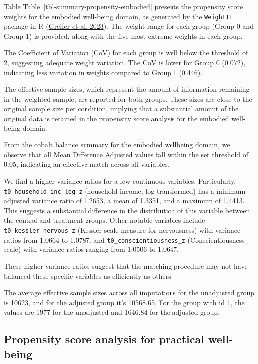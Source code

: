 \documentclass[
  singlecolumn]{report}
\begin{document}
Table Table~\ref{tbl-summary-propensity-embodied} presents the
propensity score weights for the embodied well-being domain, as
generated by the \texttt{WeightIt} package in R
(\protect\hyperlink{ref-greifer2023}{Greifer et al. 2023}). The weight
range for each group (Group 0 and Group 1) is provided, along with the
five most extreme weights in each group.

The Coefficient of Variation (CoV) for each group is well below the
threshold of 2, suggesting adequate weight variation. The CoV is lower
for Group 0 (0.072), indicating less variation in weights compared to
Group 1 (0.446).

The effective sample sizes, which represent the amount of information
remaining in the weighted sample, are reported for both groups. These
sizes are close to the original sample size per condition, implying that
a substantial amount of the original data is retained in the propensity
score analysis for the embodied well-being domain.

From the cobalt balance summary for the embodied wellbeing domain, we
observe that all Mean Difference Adjusted values fall within the set
threshold of 0.05, indicating an effective match across all variables.

We find a higher variance ratios for a few continuous variables.
Particularly, \texttt{t0\_household\_inc\_log\_z} (household income, log
transformed) has a minimum adjusted variance ratio of 1.2653, a mean of
1.3351, and a maximum of 1.4413. This suggests a substantial difference
in the distribution of this variable between the control and treatment
groups. Other notable variables include \texttt{t0\_kessler\_nervous\_z}
(Kessler scale measure for nervousness) with variance ratios from 1.0664
to 1.0787, and \texttt{t0\_conscientiousness\_z} (Conscientiousness
scale) with variance ratios ranging from 1.0506 to 1.0647.

These higher variance ratios suggest that the matching procedure may not
have balanced these specific variables as efficiently as others.

The average effective sample sizes across all imputations for the
unadjusted group is 10623, and for the adjusted group it's 10568.65. For
the group with id 1, the values are 1977 for the unadjusted and 1646.84
for the adjusted group.

\hypertarget{propensity-score-analysis-for-practical-well-being}{%
\subsection{Propensity score analysis for practical
well-being}\label{propensity-score-analysis-for-practical-well-being}}
\end{document}
